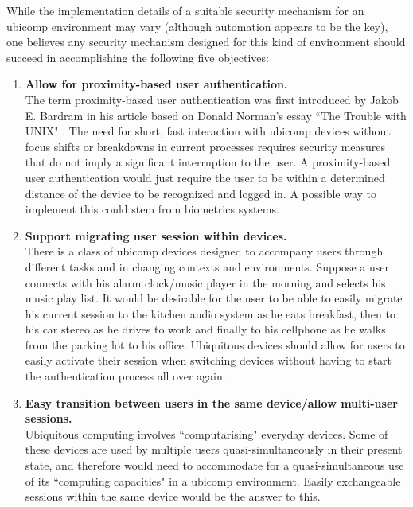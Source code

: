 \documentclass{article}
\begin{document}
While the implementation details of a suitable security mechanism for an ubicomp environment may vary (although automation appears to be the key), one believes any security mechanism designed for this kind of environment should succeed in accomplishing the following five objectives:

\begin{enumerate}
 \item \textbf{Allow for proximity-based user authentication.}\\
 The term proximity-based user authentication was first introduced by Jakob E. Bardram\cite{bardram2005trouble} in his article based on Donald Norman's essay ``The Trouble with UNIX" \cite{norman1981trouble}. The need for short, fast interaction with ubicomp devices without focus shifts or breakdowns in current processes requires security measures that do not imply a significant interruption to the user. A proximity-based user authentication would just require the user to be within a determined distance of the device to be recognized and logged in. A possible way to implement this could stem from biometrics systems. 
 
 \item \textbf{Support migrating user session within devices.}\\
 There is a class of ubicomp devices designed to accompany users through different tasks and in changing contexts and environments. Suppose a user connects with his alarm clock/music player in the morning and selects his music play list. It would be desirable for the user to be able to easily migrate his current session to the kitchen audio system as he eats breakfast, then to his car stereo as he drives to work and finally to his cellphone as he walks from the parking lot to his office. Ubiquitous devices should allow for users to easily activate their session when switching devices without having to start the authentication process all over again. 
 
 \item \textbf{Easy transition between users in the same device/allow multi-user sessions.}\\
 Ubiquitous computing involves ``computarising" everyday devices. Some of these devices are used by multiple users quasi-simultaneously in their present state, and therefore would need to accommodate for a quasi-simultaneous use of its ``computing capacities" in a ubicomp environment. Easily exchangeable sessions within the same device would be the answer to this.
 

\end{enumerate}
\end{document}
